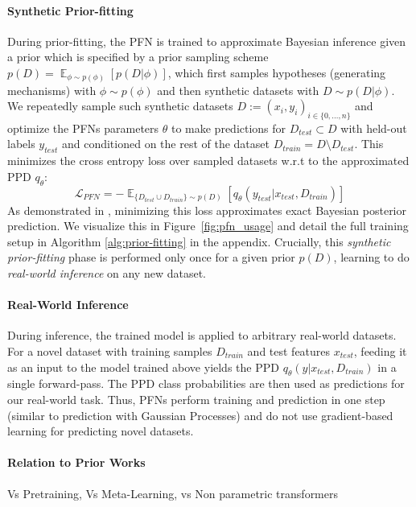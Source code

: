 \documentclass{article}
\DeclareMathOperator*{\E}{\mathbb{E}}
\begin{document}
\paragraph{Synthetic Prior-fitting} 
During prior-fitting, the PFN is trained to approximate Bayesian inference given a prior which is specified by a prior sampling scheme $p(D)=\E_{\phi \sim p(\phi)}[p(D|\phi)]$, which first samples hypotheses (generating mechanisms) with $\phi \sim p(\phi)$ and then synthetic datasets with $D \sim p(D|\phi)$.
We repeatedly sample such synthetic datasets $D:={(x_i, y_i)}_{i \in \{0,\dots,n\}}$ and optimize the PFN\textquotesingle{}s parameters $\theta$ to make predictions for $D_{test} \subset D$ with held-out labels $y_{test}$ and conditioned on the rest of the dataset $D_{train} = D \setminus D_{test}$.
This minimizes the cross entropy loss over sampled datasets w.r.t to the approximated PPD $q_{\theta}$:
\begin{equation}
    \mathcal{L}_{\textit{PFN}} = - \E_{\{D_{test} \cup D_{train}\} \sim p(D)} [q_{\theta}(y_{test}|x_{test},D_{train})]
    \label{eq:lpfn}
\end{equation}
As demonstrated in \cite{muller-iclr22a}, minimizing this loss approximates exact Bayesian posterior prediction. We visualize this in Figure~\ref{fig:pfn_usage} and detail the full training setup in Algorithm \ref{alg:prior-fitting} in the appendix.
Crucially, this \textit{synthetic prior-fitting} phase is performed only once for a given prior $p(D)$, learning to do \textit{real-world inference} on any new dataset.

\paragraph{Real-World Inference} During inference, the trained model is applied to arbitrary real-world datasets. For a novel dataset with training samples $D_{train}$ and test features $x_{test}$, feeding it as an input to the model trained above yields the PPD %
$q_{\theta}(y|x_{test},D_{train})$ in a single forward-pass. The PPD class probabilities are then used as predictions for our real-world task. Thus, PFNs perform training and prediction in one step (similar to prediction with Gaussian Processes) and do not use gradient-based learning for predicting novel datasets.

\iffalse
\paragraph{Relation to Prior Works}
Vs Pretraining, Vs Meta-Learning, vs Non parametric transformers
\end{document}
